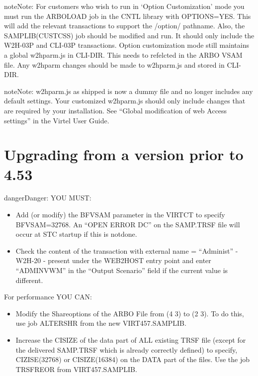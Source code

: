\documentclass[letterpaper,10pt,english]{sphinxmanual}
\begin{document}
\begin{sphinxadmonition}{note}{Note:}
For customers who wish to run in ‘Option Customization’ mode you must run the ARBOLOAD job in the CNTL library with OPTIONS=YES. This will add the relevant transactions to support the /option/ pathname. Also, the SAMPLIB(CUSTCSS) job should be modified and run. It should only include the W2H-03P and CLI-03P transactions. Option customization mode still maintains a global w2hparm.js in CLI-DIR. This needs to refelcted in the ARBO VSAM file. Any w2hparm changes should be made to w2hparm.js and stored in CLI-DIR.
\end{sphinxadmonition}

\begin{sphinxadmonition}{note}{Note:}
w2hparm.js as shipped is now a dummy file and no longer includes any default settings. Your customized w2hparm.js should only include changes that are required by your installation. See “Global modification of web Access settings” in the Virtel User Guide.
\end{sphinxadmonition}


\section{Upgrading from a version prior to 4.53}
\label{\detokenize{Migration_Guide:upgrading-from-a-version-prior-to-4-53}}\label{\detokenize{Migration_Guide:index-3}}
\begin{sphinxadmonition}{danger}{Danger:}
YOU MUST:
\end{sphinxadmonition}
\begin{itemize}
\item {} 
Add (or modify) the BFVSAM parameter in the VIRTCT to specify BFVSAM=32768. An “OPEN ERROR DC” on the SAMP.TRSF file will occur at STC startup if this is notdone.

\item {} 
Check the content of the transaction with external name = “Administ” - W2H-20 - present under the WEB2HOST entry point and enter “ADMINVWM” in the “Output Scenario” field if the current value is different.

\end{itemize}

For performance YOU CAN:
\begin{itemize}
\item {} 
Modify the Shareoptions of the ARBO File from (4 3) to (2 3). To do this, use job ALTERSHR from the new VIRT457.SAMPLIB.

\item {} 
Increase the CISIZE of the data part of ALL existing TRSF file (except for the delivered SAMP.TRSF which is already correctly defined) to specify, CIZISE(32768) or CISIZE(16384) on the DATA part of the files. Use the job TRSFREOR from VIRT457.SAMPLIB.

\end{itemize}
\end{document}
